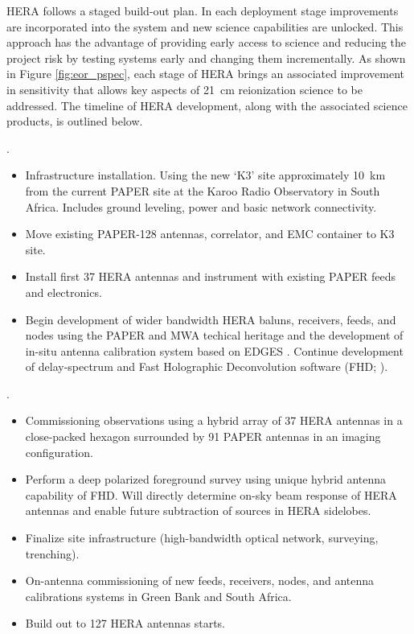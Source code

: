 \documentclass[preprint]{aastex}
\begin{document}
HERA follows a staged build-out plan.  In
each deployment stage improvements are incorporated into the system and new
science capabilities are unlocked.  This approach has the advantage of
providing early access to science and reducing the project risk by testing systems
early and changing them incrementally.  As shown in Figure \ref{fig:eor_pspec}, each
stage of HERA brings an associated improvement in sensitivity that allows key
aspects of 21~cm reionization science to be addressed.  The timeline of HERA
development, along with the associated science products, is outlined below. 


.  
\begin{itemize}\setlength{\parskip}{0pt}
\vspace{-7pt}
  \item Infrastructure installation. Using the new `K3' site approximately 10~km from the current PAPER site at the Karoo Radio Observatory in South Africa. Includes ground leveling, power and basic network connectivity.
  \item Move existing PAPER-128 antennas, correlator, and EMC container to K3 site.
  \item Install first 37 HERA antennas and instrument with existing PAPER feeds and electronics. 
  \item Begin development of wider bandwidth HERA baluns, receivers, feeds, and nodes using the PAPER and MWA techical heritage \citep{} and the development of in-situ antenna calibration system based on EDGES \citep{}. Continue development of delay-spectrum \citep{} and Fast Holographic Deconvolution software (FHD; \citealt{}).
\end{itemize}


.  
\begin{itemize}\setlength{\parskip}{0pt}
\vspace{-7pt}
  \item Commissioning observations using a hybrid array of 37 HERA antennas in a close-packed hexagon surrounded by 91 PAPER antennas in an imaging configuration.
  \item Perform a deep polarized foreground survey using unique hybrid antenna capability of FHD. Will directly determine on-sky beam response of HERA antennas and enable future subtraction of sources in HERA sidelobes.
  \item Finalize site infrastructure (high-bandwidth optical network, surveying, trenching).
  \item On-antenna commissioning of new feeds, receivers, nodes, and antenna calibrations systems in Green Bank and South Africa.
  \item Build out to 127 HERA antennas starts.
\end{itemize}
\end{document}
